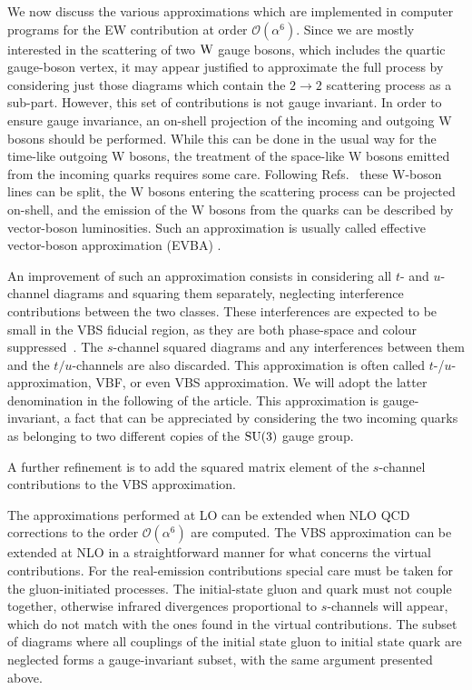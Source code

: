 We now discuss the various approximations which are implemented in computer programs for the EW contribution at order $\mathcal{O}{\left(\alpha^{6}\right)}$.
Since we are mostly interested in 
the scattering of two $\text{W}$ gauge bosons, which includes the quartic gauge-boson vertex, it may appear justified to approximate the 
full process by considering just those diagrams which contain the $2\rightarrow 2$ scattering process as a sub-part.
However, this set of contributions is not gauge invariant.
In order to ensure gauge invariance, an on-shell projection of
the incoming and outgoing W bosons should be performed.
While this can be done in the usual way for the time-like
outgoing W bosons, the treatment of the space-like W bosons
emitted from the incoming quarks requires some care.
Following Refs.~\cite{Kuss:1995yv,Accomando:2006hq} these W-boson lines can be split,
the W bosons entering the scattering process can be projected
on-shell, and the emission of the W bosons from the quarks can be
described by vector-boson luminosities.
Such an approximation is usually called effective vector-boson
approximation (EVBA) \cite{Dawson:1984gx,Duncan:1985vj,Cahn:1983ip}.

An improvement of such an approximation consists 
in considering all $t$- and $u$-channel diagrams and squaring them separately, neglecting interference contributions between the two classes.
These interferences are expected to be small in the VBS fiducial region, as they are both phase-space and colour suppressed~\cite{Oleari:2003tc,Denner:2012dz}.
The $s$-channel squared diagrams and any interferences between them and the  $t/u$-channels are also discarded.
This approximation is often called $t$-/$u$- approximation, VBF, or even VBS approximation.
We will adopt the latter denomination in the following of the article.
This approximation is gauge-invariant, a fact that can be appreciated by considering the two incoming quarks as belonging to two different copies of the $\rm{SU}(3)$ gauge group.

A further refinement is to add the squared matrix element of the $s$-channel contributions to the VBS approximation.

The approximations performed at LO can be extended when NLO QCD corrections to the order $\mathcal{O}{\left(\alpha^{6}\right)}$ are computed.
The VBS approximation can be extended at NLO in a straightforward manner for what concerns the virtual contributions.
For the real-emission contributions special care must be taken for the gluon-initiated processes.
The initial-state gluon and quark 
    must not couple together, otherwise infrared divergences proportional to $s$-channels will appear, 
     which do not match with the ones found in the virtual contributions.
     The subset of diagrams where all couplings of the initial state gluon to initial state quark are neglected forms a gauge-invariant subset, with the same argument presented above.

